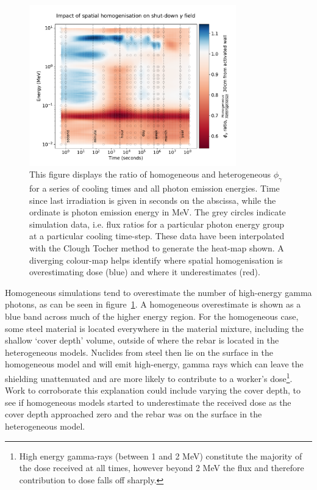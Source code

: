 \begin{figure}[H]
  \centering
  \includegraphics[width=0.8\textwidth]{sddr_nrg.pdf}
  \caption[Heat-map of homogeneous error in SDDR as a function of emitted $\gamma$ energy and cooling time.]{This figure displays the ratio of homogeneous and heterogeneous $\phi_{\gamma}$ for a series of cooling times and all photon emission energies. Time since last irradiation is given in seconds on the abscissa, while the ordinate is photon emission energy in MeV. The grey circles indicate simulation data, i.e. flux ratios for a particular photon energy group at a particular cooling time-step. These data have been interpolated with the Clough Tocher method to generate the heat-map shown. A diverging colour-map helps identify where spatial homogenisation is overestimating dose (blue) and where it underestimates (red).}
  \label{fig:sddr_nrg}
\end{figure}

Homogeneous simulations tend to overestimate the number of high-energy gamma photons, as can be seen in figure~\ref{fig:sddr_nrg}. A homogeneous overestimate is shown as a blue band across much of the higher energy region. For the homogeneous case, some steel material is located everywhere in the material mixture, including the shallow `cover depth' volume, outside of where the rebar is located in the heterogeneous models. Nuclides from steel then lie on the surface in the homogeneous model and will emit high-energy, gamma rays which can leave the shielding unattenuated and are more likely to contribute to a worker's dose\footnote{High energy gamma-rays (between 1 and 2 MeV) constitute the majority of the dose received at all times, however beyond 2 MeV the flux and therefore contribution to dose falls off sharply.}. Work to corroborate this explanation could include varying the cover depth, to see if homogeneous models started to underestimate the received dose as the cover depth approached zero and the rebar was on the surface in the heterogeneous model.

